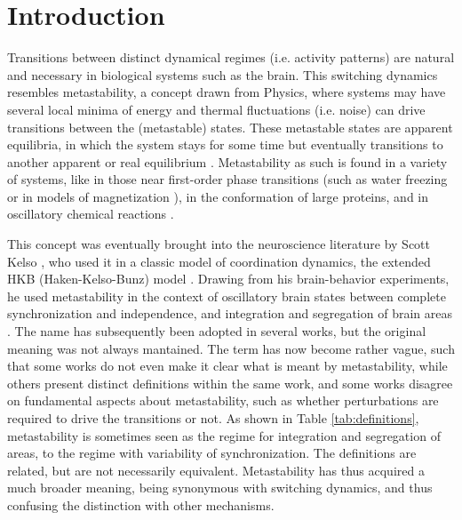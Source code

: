 \documentclass[preprint,superscriptaddress,showpacs,amsmath,amssymb,aps,pre,floatfix]{revtex4-1}
\theoremstyle{definition}
\begin{document}
\maketitle
\section{Introduction}

Transitions between distinct dynamical regimes (i.e. activity patterns) are natural and necessary in biological systems such as the brain. This switching dynamics resembles metastability, a concept drawn from Physics, where systems may have several local minima of energy and thermal fluctuations (i.e. noise) can drive transitions between the (metastable) states. These metastable states are apparent equilibria, in which the system stays for some time but eventually transitions to another apparent or real equilibrium \cite{}. Metastability as such is found in a variety of systems, like in those near first-order phase transitions (such as water freezing \cite{} or in models of magnetization \cite{}), in the conformation of large proteins, and in oscillatory chemical reactions \cite{bovier_2009}.  

This concept was eventually brought into the neuroscience literature by Scott Kelso \cite{fingelkurts_2008, fingelkurts_2017, deco_2017}, who used it in a classic model of coordination dynamics, the extended HKB (Haken-Kelso-Bunz) model \cite{kelso_1995, kelso_1995book}. Drawing from his brain-behavior experiments, he used metastability in the context of oscillatory brain states between complete synchronization and independence, and integration and segregation of brain areas \cite{deco_2017, kelso_1995book, tognoli_2014, kelso_2017}. 
The name has subsequently been adopted in several works, but the original meaning was not always mantained. The term has now become rather vague, such that some works do not even make it clear what is meant by metastability, while others present distinct definitions within the same work, and some works disagree on fundamental aspects about metastability, such as whether perturbations are required to drive the transitions or not. As shown in Table \ref{tab:definitions}, metastability is sometimes seen as the regime for integration and segregation of areas, to the regime with variability of synchronization. The definitions are related, but are not necessarily equivalent. 
Metastability has thus acquired a much broader meaning, being synonymous with switching dynamics, and thus confusing the distinction with other mechanisms.
\end{document}
